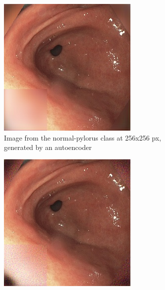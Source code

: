     
        \begin{figure}
        \centering
        \begin{subfigure}[t]{0.4\textwidth}
            \centering
            \includegraphics[width=\textwidth]{experiments/figures/both/NPAE.jpg}
            \caption{Image from the normal-pylorus class at 256x256 px, generated by an autoencoder }    
            \label{fig:np_AE_both1}
        \end{subfigure}
        \qquad
        \begin{subfigure}[t]{0.4\textwidth}  
            \centering 
            \includegraphics[width=\textwidth]{experiments/figures/both/NPGAN.jpg}

\end{subfigure}
\end{figure}
